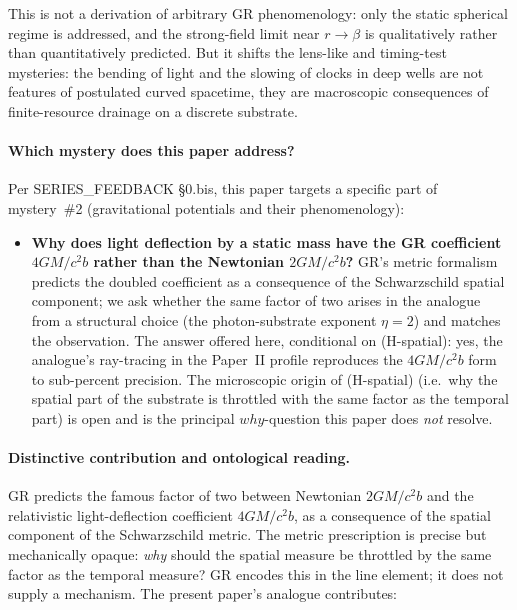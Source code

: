 \documentclass[11pt,a4paper]{article}
\begin{document}
This is not a derivation of arbitrary GR phenomenology: only the
static spherical regime is addressed, and the strong-field limit
near $r \to \beta$ is qualitatively rather than quantitatively
predicted. But it shifts the lens-like and timing-test mysteries:
the bending of light and the slowing of clocks in deep wells are not
features of postulated curved spacetime, they are macroscopic
consequences of finite-resource drainage on a discrete substrate.




\paragraph{Which mystery does this paper address?}
Per SERIES\_FEEDBACK §0.bis, this paper targets a specific part
of mystery~\#2 (gravitational potentials and their
phenomenology):

\begin{itemize}
\item \textbf{Why does light deflection by a static mass have
the GR coefficient $4GM/c^2 b$ rather than the Newtonian
$2GM/c^2 b$?} GR's metric formalism predicts the doubled
coefficient as a consequence of the Schwarzschild spatial
component; we ask whether the same factor of two arises in the
analogue from a structural choice (the photon-substrate
exponent $\eta = 2$) and matches the observation. The answer
offered here, conditional on (H-spatial): yes, the analogue's
ray-tracing in the Paper~II profile reproduces the
$4GM/c^2 b$ form to sub-percent precision. The microscopic
origin of (H-spatial) (i.e.\ why the spatial part of the
substrate is throttled with the same factor as the temporal
part) is open and is the principal $why$-question this paper
does \emph{not} resolve.
\end{itemize}

\paragraph{Distinctive contribution and ontological reading.}
GR predicts the famous factor of two between Newtonian
$2GM/c^2 b$ and the relativistic light-deflection coefficient
$4GM/c^2 b$, as a consequence of the spatial component of the
Schwarzschild metric. The metric prescription is precise but
mechanically opaque: \emph{why} should the spatial measure be
throttled by the same factor as the temporal measure? GR
encodes this in the line element; it does not supply a
mechanism. The present paper's analogue contributes:
\end{document}
